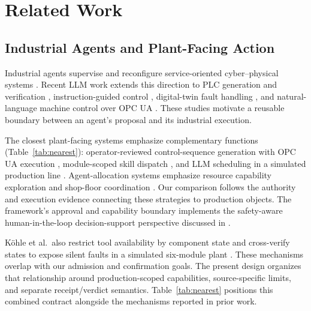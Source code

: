 \section{Related Work}
\label{sec:related}
\subsection{Industrial Agents and Plant-Facing Action}
Industrial agents supervise and reconfigure service-oriented cyber--physical systems
\cite{biskupovic2025supervision}. Recent LLM work extends this direction to
PLC generation and verification \cite{liu2026agents4plc}, instruction-guided
control \cite{wu2025instructmpc}, digital-twin fault handling
\cite{gill2025llmdt}, and natural-language machine control over OPC UA
\cite{hofmann2025nlc}. These studies motivate a reusable boundary between an
agent's proposal and its industrial execution.

The closest plant-facing systems emphasize complementary functions
(Table~\ref{tab:nearest}): operator-reviewed control-sequence generation with
OPC UA execution \cite{huang2026made}, module-scoped skill dispatch
\cite{koehle2026llmdriven}, and LLM scheduling in a simulated production
line \cite{waseem2026pretrained}. Agent-allocation systems emphasize resource
capability exploration and shop-floor coordination
\cite{lim2025llmenabled,zhao2026shopfloor}. Our comparison follows the
authority and execution evidence connecting these strategies to production
objects. The framework's approval and capability boundary implements the
safety-aware human-in-the-loop decision-support perspective discussed in
\cite{jiang2026agentic}.

K{\"o}hle et al.\ also restrict tool availability by component state and
cross-verify states to expose silent faults in a simulated six-module plant
\cite{koehle2026llmdriven}. These mechanisms overlap with our admission and
confirmation goals. The present design organizes that relationship around
production-scoped capabilities, source-specific limits, and separate
receipt/verdict semantics. Table~\ref{tab:nearest} positions
this combined contract alongside the mechanisms reported in prior work.

